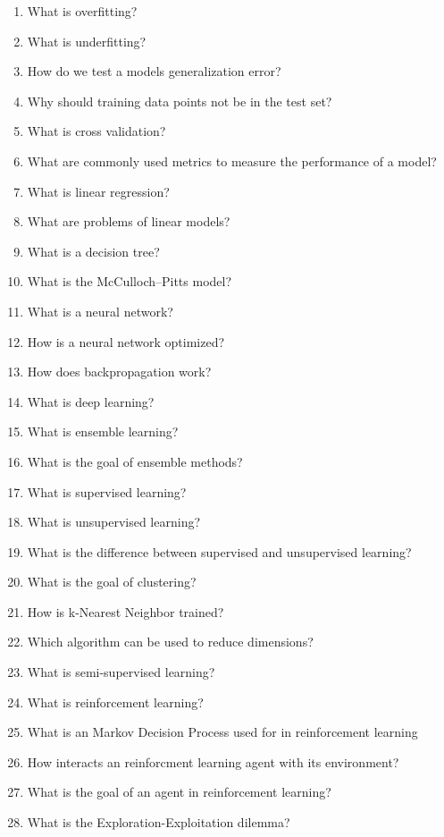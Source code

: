 \begin{enumerate}
    \item What is overfitting?  
    \item What is underfitting?  
    \item How do we test a models generalization error?  
    \item Why should training data points not be in the test set?  
    \item  What is cross validation?  
     \item What are commonly used metrics to measure the performance of a model?  
     \item What is linear regression?  
     \item What are problems of linear models?  
     \item What is a decision tree?  
     \item What is the McCulloch–Pitts model?  
     \item What is a neural network?  
     \item How is a neural network optimized?  
     \item How does backpropagation work?  
     \item What is deep learning?  
     \item What is ensemble learning?  
     \item What is the goal of ensemble methods?  
     \item What is supervised learning? 
     \item What is unsupervised learning?  
     \item What is the difference between supervised and unsupervised learning?  
     \item What is the goal of clustering?  
     \item How is k-Nearest Neighbor trained?  
     \item Which algorithm can be used to reduce dimensions?  
     \item What is semi-supervised learning?  
     \item What is reinforcement learning?  
     \item What is an Markov Decision Process used for in reinforcement learning  
     \item How interacts an reinforcment learning agent with its environment?  
     \item What is the goal of an agent in reinforcement learning?  
     \item What is the Exploration-Exploitation dilemma? 
\end{enumerate}
